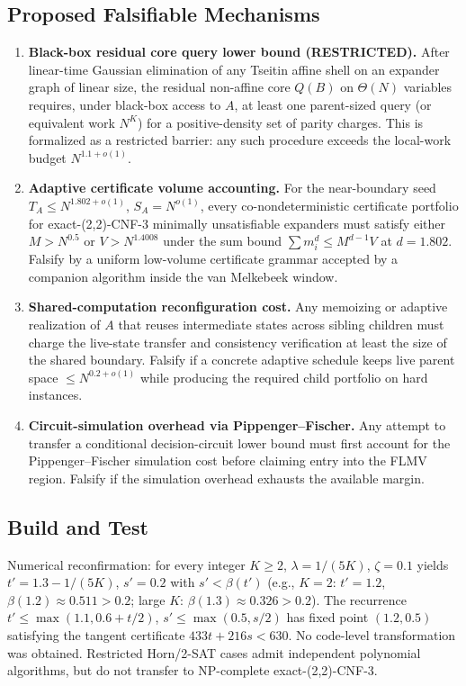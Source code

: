 \subsection{Proposed Falsifiable Mechanisms}
\begin{enumerate}
\item \textbf{Black-box residual core query lower bound (RESTRICTED).} After linear-time Gaussian elimination of any Tseitin affine shell on an expander graph of linear size, the residual non-affine core $Q(B)$ on $\Theta(N)$ variables requires, under black-box access to $A$, at least one parent-sized query (or equivalent work $N^{K}$) for a positive-density set of parity charges. This is formalized as a restricted barrier: any such procedure exceeds the local-work budget $N^{1.1+o(1)}$.
\item \textbf{Adaptive certificate volume accounting.} For the near-boundary seed $T_A\le N^{1.802+o(1)}$, $S_A=N^{o(1)}$, every co-nondeterministic certificate portfolio for exact-(2,2)-CNF-3 minimally unsatisfiable expanders must satisfy either $M>N^{0.5}$ or $V>N^{1.4008}$ under the sum bound $\sum m_i^d\le M^{d-1}V$ at $d=1.802$. Falsify by a uniform low-volume certificate grammar accepted by a companion algorithm inside the van Melkebeek window.
\item \textbf{Shared-computation reconfiguration cost.} Any memoizing or adaptive realization of $A$ that reuses intermediate states across sibling children must charge the live-state transfer and consistency verification at least the size of the shared boundary. Falsify if a concrete adaptive schedule keeps live parent space $\le N^{0.2+o(1)}$ while producing the required child portfolio on hard instances.
\item \textbf{Circuit-simulation overhead via Pippenger--Fischer.} Any attempt to transfer a conditional decision-circuit lower bound must first account for the Pippenger--Fischer simulation cost before claiming entry into the FLMV region. Falsify if the simulation overhead exhausts the available margin.
\end{enumerate}

\subsection{Build and Test}
Numerical reconfirmation: for every integer $K\ge 2$, $\lambda=1/(5K)$, $\zeta=0.1$ yields $t'=1.3-1/(5K)$, $s'=0.2$ with $s'<\beta(t')$ (e.g., $K=2$: $t'=1.2$, $\beta(1.2)\approx0.511>0.2$; large $K$: $\beta(1.3)\approx0.326>0.2$). The recurrence $t'\le\max(1.1,0.6+t/2)$, $s'\le\max(0.5,s/2)$ has fixed point $(1.2,0.5)$ satisfying the tangent certificate $433t+216s<630$. No code-level transformation was obtained. Restricted Horn/2-SAT cases admit independent polynomial algorithms, but do not transfer to NP-complete exact-(2,2)-CNF-3.


